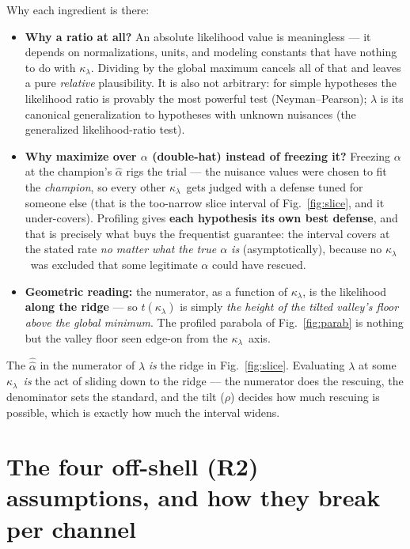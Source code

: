 \documentclass[11pt]{article}
\newcommand{\kl}{\ensuremath{\kappa_\lambda}}
\newcommand{\ahh}{\ensuremath{\hat{\hat\alpha}}}
\begin{document}
Why each ingredient is there:
\begin{itemize}
\item \textbf{Why a ratio at all?} An absolute likelihood value is meaningless --- it depends on
  normalizations, units, and modeling constants that have nothing to do with \kl. Dividing by the global
  maximum cancels all of that and leaves a pure \emph{relative} plausibility. It is also not arbitrary: for
  simple hypotheses the likelihood ratio is provably the most powerful test (Neyman--Pearson); $\lambda$ is its
  canonical generalization to hypotheses with unknown nuisances (the generalized likelihood-ratio test).
\item \textbf{Why maximize over $\alpha$ (double-hat) instead of freezing it?} Freezing $\alpha$ at the
  champion's $\hat\alpha$ rigs the trial --- the nuisance values were chosen to fit the \emph{champion}, so
  every other \kl\ gets judged with a defense tuned for someone else (that is the too-narrow slice interval of
  Fig.~\ref{fig:slice}, and it under-covers). Profiling gives \textbf{each hypothesis its own best defense},
  and that is precisely what buys the frequentist guarantee: the interval covers at the stated rate \emph{no
  matter what the true $\alpha$ is} (asymptotically), because no \kl\ was excluded that some legitimate
  $\alpha$ could have rescued.
\item \textbf{Geometric reading:} the numerator, as a function of \kl, is the likelihood \textbf{along the
  ridge} --- so $t(\kl)$ is simply \emph{the height of the tilted valley's floor above the global minimum}. The
  profiled parabola of Fig.~\ref{fig:parab} is nothing but the valley floor seen edge-on from the \kl\ axis.
\end{itemize}

\begin{keybox}
The $\ahh$ in the numerator of $\lambda$ \emph{is} the ridge in Fig.~\ref{fig:slice}. Evaluating $\lambda$ at
some \kl\ \emph{is} the act of sliding down to the ridge --- the numerator does the rescuing, the denominator
sets the standard, and the tilt ($\rho$) decides how much rescuing is possible, which is exactly how much the
interval widens.
\end{keybox}

\section{The four off-shell (R2) assumptions, and how they break per channel}\label{sec:assumptions}
\end{document}
